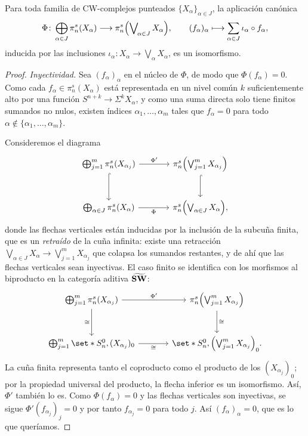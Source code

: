 \begin{prop}\label{prop:aditividad-pi}
Para toda familia de CW-complejos punteados $\{X_\alpha\}_{\alpha\in J}$, la aplicación canónica
\[
\Phi\colon\bigoplus_{\alpha\in J}\pi_n^s(X_\alpha)\longrightarrow\pi_n^s\Bigl(\bigvee\nolimits_{\!\alpha\in J}X_\alpha\Bigr),
\qquad
(f_\alpha)_\alpha\longmapsto\sum_{\alpha\in J}\iota_\alpha\circ f_\alpha,
\]
inducida por las inclusiones $\iota_\alpha\colon X_\alpha\to\bigvee_{\!\alpha}X_\alpha$, es un isomorfismo.
\end{prop}
\begin{proof}
\emph{Inyectividad.} Sea $(f_\alpha)_\alpha$ en el núcleo de $\Phi$, de modo que $\Phi(f_\alpha)=0$. Como cada $f_\alpha\in\pi_n^s(X_\alpha)$ está representada en un nivel común $k$ suficientemente alto por una función $S^{n+k}\to\Sigma^kX_\alpha$, y como una suma directa solo tiene finitos sumandos no nulos, existen índices $\alpha_1,\dots,\alpha_m$ tales que $f_\alpha=0$ para todo $\alpha\notin\{\alpha_1,\dots,\alpha_m\}$.

Consideremos el diagrama
\[
\begin{tikzcd}[sep=large, every cell/.append style={nodes={execute at begin node=\textstyle}}]
\bigoplus_{j=1}^m\pi_n^s(X_{\alpha_j}) \arrow[r,"{\Phi'}"] \arrow[d,hook] & \pi_n^s\Bigl(\bigvee_{j=1}^mX_{\alpha_j}\Bigr) \arrow[d,hook]\\
\bigoplus_{\alpha\in J}\pi_n^s(X_\alpha) \arrow[r,"\Phi"'] & \pi_n^s\Bigl(\bigvee_{\alpha\in J}X_\alpha\Bigr),
\end{tikzcd}
\]
donde las flechas verticales están inducidas por la inclusión de la subcuña finita, que es un \emph{retraído} de la cuña infinita: existe una retracción $\bigvee_{\alpha\in J}X_\alpha\to\bigvee_{j=1}^mX_{\alpha_j}$ que colapsa los sumandos restantes, y de ahí que las flechas verticales sean inyectivas. El caso finito se identifica con los morfismos al biproducto en la categoría aditiva $\widetilde{\mathbf{SW}}$:
\[
\begin{tikzcd}[sep=large, every cell/.append style={nodes={execute at begin node=\textstyle}}]
\bigoplus_{j=1}^m\pi_n^s(X_{\alpha_j}) \arrow[r,"\Phi'"] \arrow[d,"\cong"'] & \pi_n^s\!\left(\bigvee_{j=1}^mX_{\alpha_j}\right) \arrow[d,"\cong"]\\
\bigoplus_{j=1}^m\set*{S^0_n,(X_{\alpha_j})_0} \arrow[r,"\cong"'] & \set*{S^0_n,\left(\bigvee_{j=1}^mX_{\alpha_j}\right)_0}.
\end{tikzcd}
\]
La cuña finita representa tanto el coproducto como el producto de los $(X_{\alpha_j})_0$; por la propiedad universal del producto, la flecha inferior es un isomorfismo. Así, $\Phi'$ también lo es. Como $\Phi(f_\alpha)=0$ y las flechas verticales son inyectivas, se sigue $\Phi'(f_{\alpha_j})_j=0$ y por tanto $f_{\alpha_j}=0$ para todo $j$. Así $(f_\alpha)_\alpha=0$, que es lo que queríamos.


\end{proof}
